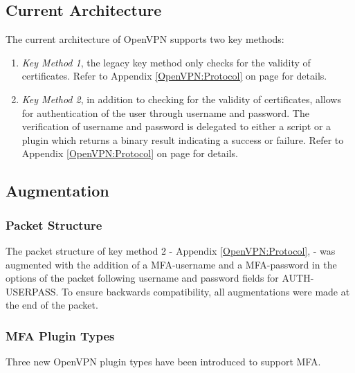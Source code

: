 \documentclass[11pt,oneside]{book}
\begin{document}
\subsection{Current Architecture}
The current architecture of OpenVPN supports two key methods:

\begin{enumerate}
    \item \emph{Key Method 1}, the legacy key method only checks for the validity of certificates.
        Refer to Appendix \ref{OpenVPN:Protocol} on page \pageref{OpenVPN:Protocol} for details.
    \item \emph{Key Method 2}, in addition to checking for the validity of certificates, allows for
        authentication of the user through username and password. The verification of username and
        password is delegated to either a script or a plugin which returns a binary result
        indicating a success or failure.
        Refer to Appendix \ref{OpenVPN:Protocol} on page \pageref{OpenVPN:Protocol} for details.
\end{enumerate}

\subsection{Augmentation}
\subsubsection{Packet Structure}
The packet structure of key method 2 - Appendix \ref{OpenVPN:Protocol}, \pageref{OpenVPN:protocol} -
was augmented with the addition of a MFA-username and a MFA-password in the options of the packet
following username and password fields for AUTH-USERPASS. To ensure backwards compatibility, all
augmentations were made at the end of the packet.

\subsubsection{MFA Plugin Types}
\label{MFA:Types}
Three new OpenVPN plugin types have been introduced to support MFA.
\end{document}
